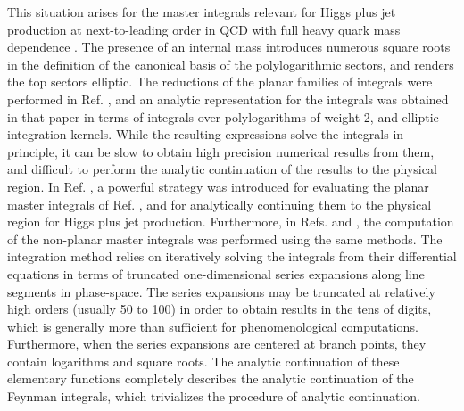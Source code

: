 \documentclass{article}
\begin{document}
This situation arises for the master integrals relevant for Higgs plus jet production at next-to-leading order in QCD with full heavy quark mass dependence \cite{Bonciani:2016qxi, Bonciani:2019jyb, Frellesvig:2019byn}. The presence of an internal mass introduces numerous square roots in the definition of the canonical basis of the polylogarithmic sectors, and renders the top sectors elliptic. The reductions of the planar families of integrals were performed in Ref. \cite{Bonciani:2016qxi}, and an analytic representation for the integrals was obtained in that paper in terms of integrals over polylogarithms of weight 2, and elliptic integration kernels. While the resulting expressions solve the integrals in principle, it can be slow to obtain high precision numerical results from them, and difficult to perform the analytic continuation of the results to the physical region. 
In Ref. \cite{Francesco:2019yqt}, a powerful strategy was introduced for evaluating the planar master integrals of Ref. \cite{Bonciani:2016qxi}, and for analytically continuing them to the physical region for Higgs plus jet production. Furthermore, in Refs. \cite{Bonciani:2019jyb} and \cite{Frellesvig:2019byn}, the computation of the non-planar master integrals was performed using the same methods. The integration method relies on iteratively solving the integrals from their differential equations in terms of truncated one-dimensional series expansions along line segments in phase-space. The series expansions may be truncated at relatively high orders (usually 50 to 100) in order to obtain results in the tens of digits, which is generally more than sufficient for phenomenological computations. Furthermore, when the series expansions are centered at branch points, they contain logarithms and square roots. The analytic continuation of these elementary functions completely describes the analytic continuation of the Feynman integrals, which trivializes the procedure of analytic continuation. 
\end{document}
